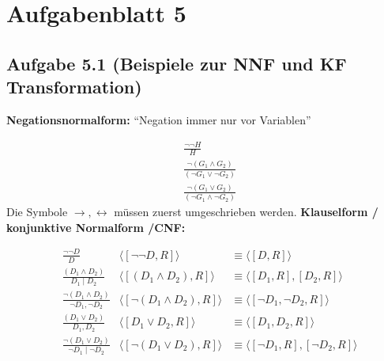 
\section{Aufgabenblatt 5}
\subsection{Aufgabe 5.1 (Beispiele zur NNF und KF Transformation)}
\textbf{Negationsnormalform:} ``Negation immer nur vor Variablen''

\begin{align}
	&\frac{\neg\neg H}{H}\label{Neg1}\tag{NNF1}\\
	&\frac{\neg(G_1\wedge G_2)}{(\neg G_1\vee\neg G_2)}\label{Neg2}\tag{NNF2}\\
	&\frac{\neg(G_1\vee G_2)}{(\neg G_1\wedge\neg  G_2)}\label{Neg3}\tag{NNF3}
\end{align}
Die Symbole $\to, \leftrightarrow$ müssen zuerst umgeschrieben werden.\nl
\textbf{Klauselform / konjunktive Normalform /CNF:}

\begin{align}
	&\frac{\neg\neg D}{D}\label{KNF1}\tag{KNF1} 
		&\langle[\neg\neg D,R]\rangle&\equiv\langle[D,R]\rangle\\
	&\frac{(D_1\wedge D_2)}{D_1\mid D_2}\label{KNF2}\tag{KNF2} 
		&\langle[(D_1\wedge D_2),R]\rangle&\equiv \langle[D_1,R],[D_2,R]\rangle\\
	&\frac{\neg(D_1\wedge D_2)}{\neg D_1,\neg D_2}\label{KNF3}\tag{KNF3}
		&\langle[\neg(D_1\wedge D_2),R]\rangle&\equiv\langle[\neg D_1,\neg D_2,R]\rangle\\
	&\frac{(D_1\vee D_2)}{D_1, D_2}\label{KNF4}\tag{KNF4}
		&\langle[D_1\vee D_2,R]\rangle&\equiv\langle[D_1,D_2,R]\rangle\\
	&\frac{\neg(D_1\vee D_2)}{\neg D_1\mid\neg D_2}\label{KNF5}\tag{KNF5}
		&\langle[\neg(D_1\vee D_2),R]\rangle&\equiv\langle[\neg D_1,R],[\neg D_2,R]\rangle
\end{align}

